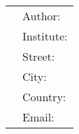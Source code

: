 \clearpage

\begin{table}[h]
\footnotesize
        \begin{tabular}{ll}
        &Author: \\
        &Institute: \\
        &Street: \\
        &City: \\
        &Country:  \\
        &Email: \\
        \end{tabular}
\end{table}